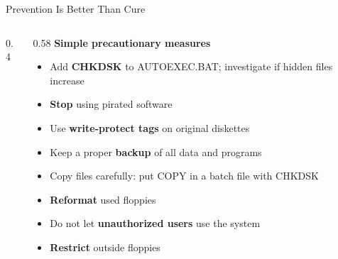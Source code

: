 \documentclass[aspectratio=169,11pt,xcolor={table}]{beamer}
\begin{document}
\begin{frame}{Prevention Is Better Than Cure}
  \begin{columns}[c]
    \begin{column}{0.4\textwidth}
      \centering
    \end{column}
    \begin{column}{0.58\textwidth}
      \textbf{Simple precautionary measures}
      \begin{itemize}\small\setlength{\itemsep}{2pt}
        \item Add \textbf{CHKDSK} to AUTOEXEC.BAT; investigate if hidden files increase
        \item \textbf{Stop} using pirated software
        \item Use \textbf{write-protect tags} on original diskettes
        \item Keep a proper \textbf{backup} of all data and programs
        \item Copy files carefully: put COPY in a batch file with CHKDSK
        \item \textbf{Reformat} used floppies
        \item Do not let \textbf{unauthorized users} use the system
        \item \textbf{Restrict} outside floppies
      \end{itemize}
    \end{column}
  \end{columns}
\end{frame}
\end{document}

